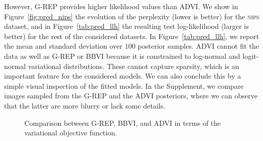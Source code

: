 However, \acrshort{G-REP} provides higher likelihood values than \gls{ADVI}. We show in Figure~\ref{fig:pred_nips} the evolution of the perplexity (lower is better) for the \textsc{nips} dataset, and in Figure~\ref{tab:pred_llh} the resulting test log-likelihood (larger is better) for the rest of the considered datasets. In Figure~\ref{tab:pred_llh}, we report the mean and standard deviation over $100$ posterior samples. \gls{ADVI} cannot fit the data as well as \acrshort{G-REP} or \gls{BBVI} because it is constrained to log-normal and logit-normal variational distributions. These cannot capture sparsity, which is an important feature for the considered models. We can also conclude this by a simple visual inspection of the fitted models. In the Supplement, we compare images sampled from the \acrshort{G-REP} and the \gls{ADVI} posteriors, where we can observe that the latter are more blurry or lack some details.

\begin{figure}[t]
	\centering
	\hspace*{-11pt}
	\hspace*{-15pt}
  \vspace*{-4pt}
	\caption{\label{fig:elbo}Comparison between \acrshort{G-REP}, \gls{BBVI}, and \gls{ADVI} in terms of the variational objective function.}
  \vspace*{-12pt}
\end{figure}

